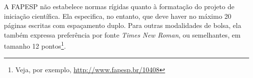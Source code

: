 
A FAPESP não estabelece normas rígidas quanto à formatação do projeto de iniciação científica. Ela especifica, no entanto, que deve haver no máximo 20 páginas escritas com espaçamento duplo. Para outras modalidades de bolsa, ela também expressa preferência por fonte \textit{Times New Roman}, ou semelhantes, em tamanho 12 pontos\footnote{Veja, por exemplo, \url{http://www.fapesp.br/10408}}.